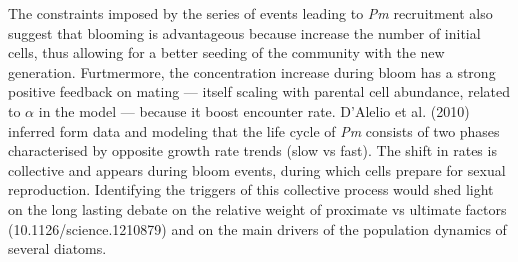 \documentclass[a4paper,oneside]{article}
\begin{document}
    The constraints imposed by the series of events leading to \textit{Pm} recruitment also suggest that blooming is advantageous because increase the number of initial cells, thus allowing for a better seeding of the community with the new generation.
    Furtmermore, the concentration increase during bloom has a strong positive feedback on mating --- itself scaling with parental cell abundance, related to $\alpha$ in the model --- because it boost encounter rate.
    D'Alelio et al. (2010) inferred form data and modeling that the life cycle of \textit{Pm} consists of two phases characterised by opposite growth rate trends (slow vs fast).
    The shift in rates is collective and appears during bloom events, during which cells prepare for sexual reproduction.
    Identifying the triggers of this collective process would shed light on the long lasting debate on the relative weight of proximate vs ultimate factors (10.1126/science.1210879) and on the main drivers of the population dynamics of several diatoms.
\end{document}
